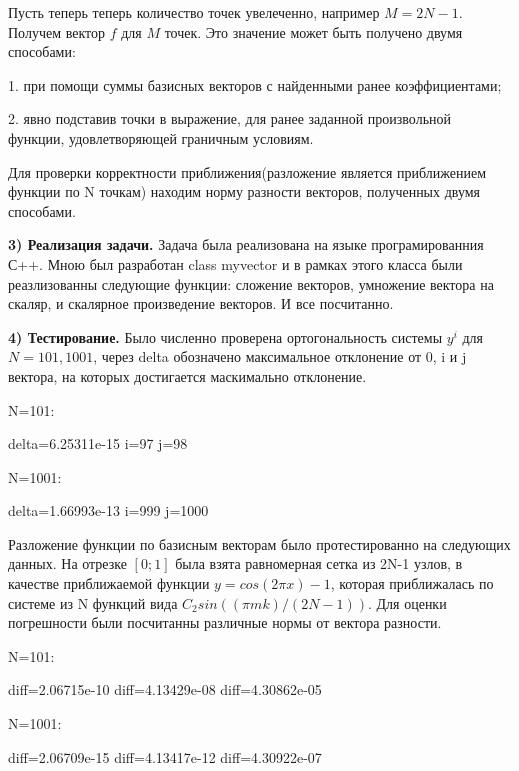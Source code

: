 \documentclass[12pt,a4paper]{scrartcl}
\begin{document}
Пусть теперь теперь количество точек увелеченно, например $M = 2N-1$. Получем вектор $f$ для $M$ точек. Это значение может быть получено двумя способами:

1. при помощи суммы базисных векторов с найденными ранее коэффициентами;

2. явно подставив точки в выражение, для ранее заданной произвольной функции, удовлетворяющей граничным условиям.

Для проверки корректности приближения(разложение является приближением функции по N точкам) находим норму разности векторов, полученных двумя способами.

\textbf{3) Реализация задачи.}
Задача была реализована на языке програмированния С++. Мною был разработан class myvector и в рамках этого класса были реазлизованны следующие функции: сложение векторов, умножение вектора на скаляр, и скалярное произведение векторов. И все посчитанно.

\textbf{4) Тестирование.}
Было численно проверена ортогональность системы $y^i$ для $N=101,1001$, через delta обозначено максимальное отклонение от 0, i и j вектора, на которых достигается маскимально отклонение.

N=101:

delta=6.25311e-15 i=97 j=98

N=1001:

delta=1.66993e-13 i=999 j=1000

Разложение функции по базисным векторам было протестированно на следующих данных. На отрезке $[0;1]$ была взята равномерная сетка из 2N-1 узлов, в качестве приближаемой функции $y=cos(2\pi x) - 1$, которая приближалась по системе из N функций вида $C_2 sin ((\pi m k)/(2N-1))$. Для оценки погрешности были посчитанны различные нормы от вектора разности.

N=101:

diff=2.06715e-10 diff=4.13429e-08 diff=4.30862e-05

N=1001:

diff=2.06709e-15 diff=4.13417e-12 diff=4.30922e-07
\end{document}
